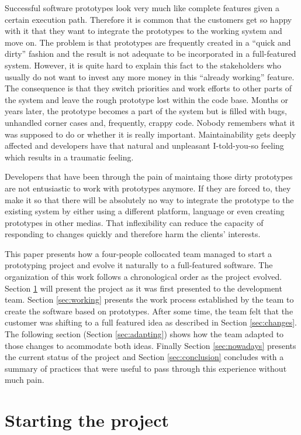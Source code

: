 \documentclass[lnbip]{svmultln}
\begin{document}
Successful software prototypes look very much like complete features
given a certain execution path. Therefore it is common that the
customers get so happy with it that they want to integrate the
prototypes to the working system and move on. The problem is that
prototypes are frequently created in a ``quick and dirty'' fashion and
the result is not adequate to be incorporated in a full-featured
system. However, it is quite hard to explain this fact to the
stakeholders who usually do not want to invest any more money in this
``already working'' feature. The consequence is that they switch
priorities and work efforts to other parts of the system and leave the
rough prototype lost within the code base. Months or years later, the
prototype becomes a part of the system but is filled with bugs,
unhandled corner cases and, frequently, crappy code. Nobody remembers
what it was supposed to do or whether it is really
important. Maintainability gets deeply affected and developers have
that natural and unpleasant I-told-you-so feeling which results in a
traumatic feeling.

Developers that have been through the pain of maintaing those dirty
prototypes are not entusiastic to work with prototypes anymore. If
they are forced to, they make it so that there will be absolutely no
way to integrate the prototype to the existing system by either using
a different platform, language or even creating prototypes in other
medias. That inflexibility can reduce the capacity of responding to
changes quickly and therefore harm the clients' interests.

This paper presents how a four-people collocated team managed to start
a prototyping project and evolve it naturally to a full-featured
software. The organization of this work follows a chronological order
as the project evolved. Section \ref{sec:start} will present the
project as it was first presented to the development team. Section
\ref{sec:working} presents the work process established by the team to
create the software based on prototypes.  After some time, the team
felt that the customer was shifting to a full featured idea as
described in Section \ref{sec:changes}. The following section (Section
\ref{sec:adapting}) shows how the team adapted to those changes to
acommodate both ideas. Finally Section \ref{sec:nowadays} presents the
current status of the project and Section \ref{sec:conclusion}
concludes with a summary of practices that were useful to pass through
this experience without much pain.

\section{Starting the project}
\label{sec:start}
\end{document}
